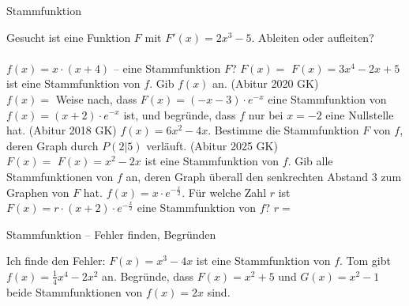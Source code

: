 \setcounter{aufgabe}{7}

\begin{aufgabe}{Stammfunktion}
\begin{teile}
\teil Gesucht ist eine Funktion $F$ mit $F'(x) = 2x^3 - 5$. Ableiten oder aufleiten? \\  \\ 
\teil $f(x) = x \cdot (x + 4)$ – eine Stammfunktion $F$? $F(x) = $ \leerfeld
\teil $F(x) = 3x^4 - 2x + 5$ ist eine Stammfunktion von $f$. Gib $f(x)$ an. \hfill (Abitur 2020 GK) \\ $f(x) = $ \leerfeld
\teil Weise nach, dass $F(x) = (-x - 3) \cdot e^{-x}$ eine Stammfunktion von $f(x) = (x + 2) \cdot e^{-x}$ ist, und begründe, dass $f$ nur bei $x = -2$ eine Nullstelle hat. \hfill (Abitur 2018 GK)
\teil $f(x) = 6x^2 - 4x$. Bestimme die Stammfunktion $F$ von $f$, deren Graph durch $P(2 | 5)$ verläuft. \hfill (Abitur 2025 GK) \\ $F(x) = $ \leerfeld
\teil $F(x) = x^2 - 2x$ ist eine Stammfunktion von $f$. Gib alle Stammfunktionen von $f$ an, deren Graph überall den senkrechten Abstand $3$ zum Graphen von $F$ hat.
\teil $f(x) = x \cdot e^{-\frac{x}{2}}$. Für welche Zahl $r$ ist $F(x) = r \cdot (x + 2) \cdot e^{-\frac{x}{2}}$ eine Stammfunktion von $f$? $r = $ \leerfeld
\end{teile}
\end{aufgabe}

\begin{aufgabe}{Stammfunktion – Fehler finden, Begründen}
\begin{teile}
\teil Ich finde den Fehler: $F(x) = x^3 - 4x$ ist eine Stammfunktion von $f$. Tom gibt $f(x) = \frac{1}{4}x^4 - 2x^2$ an.
\teil Begründe, dass $F(x) = x^2 + 5$ und $G(x) = x^2 - 1$ beide Stammfunktionen von $f(x) = 2x$ sind.
\end{teile}
\end{aufgabe}
